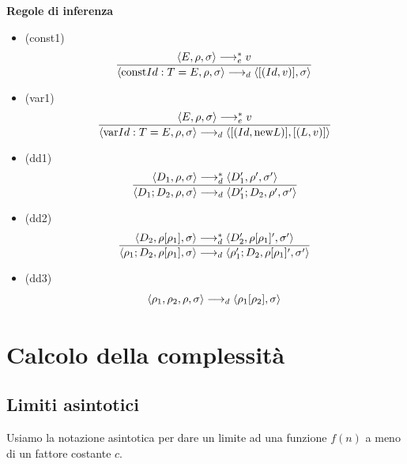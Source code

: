 \documentclass{article}
\begin{document}
\noindent\textbf{Regole di inferenza}
\begin{itemize}
    \item (const1)
          \[\frac
              {\langle E,\rho,\sigma \rangle \longrightarrow^*_e v}
              {\langle \text{const} Id: T = E,\rho,\sigma \rangle \longrightarrow_d \langle [(Id,v)],\sigma \rangle}\]

    \item (var1)
          \[\frac
              {\langle E,\rho,\sigma \rangle \longrightarrow^*_e v}
              {\langle \text{var} Id: T = E,\rho,\sigma \rangle \longrightarrow_d \langle [(Id,\text{new} L)],[(L,v)] \rangle}\]

    \item (dd1)
          \[\frac
              {\langle D_1,\rho,\sigma \rangle \longrightarrow^*_d \langle D_1',\rho',\sigma' \rangle}
              {\langle D_1;D_2,\rho,\sigma \rangle \longrightarrow_d \langle D_1';D_2,\rho',\sigma' \rangle}\]

    \item (dd2)
          \[\frac
              {\langle D_2,\rho[\rho_1],\sigma \rangle \longrightarrow^*_d \langle D_2',\rho[\rho_1]',\sigma' \rangle}
              {\langle \rho_1;D_2,\rho[\rho_1],\sigma \rangle \longrightarrow_d \langle \rho_1';D_2,\rho[\rho_1]',\sigma' \rangle}\]

    \item (dd3)
          \[\langle \rho_1,\rho_2,\rho,\sigma \rangle \longrightarrow_d \langle \rho_1[\rho_2], \sigma \rangle\]
\end{itemize}

\pagebreak
\section{Calcolo della complessità}
\subsection{Limiti asintotici}
Usiamo la notazione asintotica per dare un limite ad una funzione \(f(n)\) a meno di un fattore costante \(c\).
\end{document}
